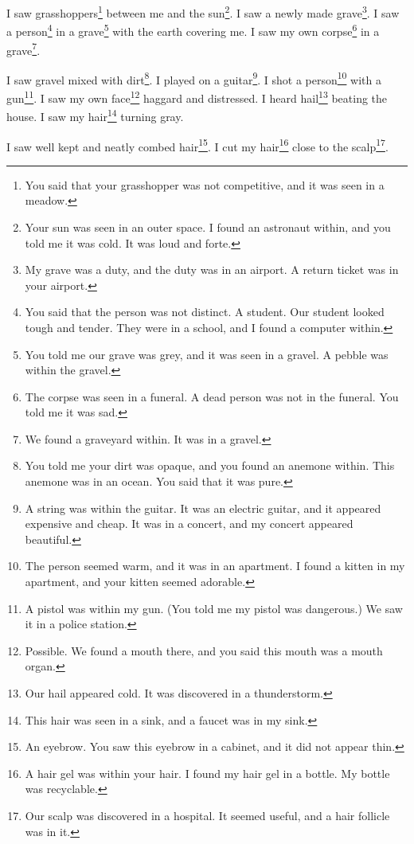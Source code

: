 \documentclass[12pt]{book}
\begin{document}
 I saw grasshoppers\footnote{You said that your grasshopper was not competitive, and it was seen in a meadow.} between me and the sun\footnote{Your sun was seen in an outer space. I found an astronaut within, and you told me it was cold. It was loud and forte.}. I saw a newly made grave\footnote{My grave was a duty, and the duty was in an airport. A return ticket was in your airport.}. I saw a person\footnote{You said that the person was not distinct. A student. Our student looked tough and tender. They were in a school, and I found a computer within.} in a grave\footnote{You told me our grave was grey, and it was seen in a gravel. A pebble was within the gravel.} with the earth covering me. I saw my own corpse\footnote{The corpse was seen in a funeral. A dead person was not in the funeral. You told me it was sad.} in a grave\footnote{We found a graveyard within. It was in a gravel.}. 

 I saw gravel mixed with dirt\footnote{You told me your dirt was opaque, and you found an anemone within. This anemone was in an ocean. You said that it was pure.}. I played on a guitar\footnote{A string was within the guitar. It was an electric guitar, and it appeared expensive and cheap. It was in a concert, and my concert appeared beautiful.}. I shot a person\footnote{The person seemed warm, and it was in an apartment. I found a kitten in my apartment, and your kitten seemed adorable.} with a gun\footnote{A pistol was within my gun. (You told me my pistol was dangerous.) We saw it in a police station.}. I saw my own face\footnote{Possible. We found a mouth there, and you said this mouth was a mouth organ.} haggard and distressed. I heard hail\footnote{Our hail appeared cold. It was discovered in a thunderstorm.} beating the house. I saw my hair\footnote{This hair was seen in a sink, and a faucet was in my sink.} turning gray. 

 I saw well kept and neatly combed hair\footnote{An eyebrow. You saw this eyebrow in a cabinet, and it did not appear thin.}. I cut my hair\footnote{A hair gel was within your hair. I found my hair gel in a bottle. My bottle was recyclable.} close to the scalp\footnote{Our scalp was discovered in a hospital. It seemed useful, and a hair follicle was in it.}. 
\end{document}
